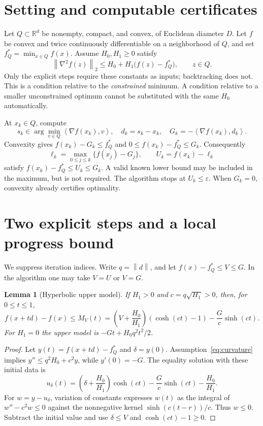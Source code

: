 \documentclass[11pt]{article}
\newtheorem{lemma}[theorem]{Lemma}
\newcommand{\norm}[1]{\left\|#1\right\|}
\newcommand{\inner}[2]{\left\langle#1,#2\right\rangle}
\newcommand{\R}{\mathbb R}
\begin{document}
\section{Setting and computable certificates}
Let $Q\subset\R^d$ be nonempty, compact, and convex, of Euclidean diameter
$D$. Let $f$ be convex and twice continuously differentiable on a neighborhood
of $Q$, and set $f_Q^*=\min_{x\in Q}f(x)$. Assume $H_0,H_1\ge0$ satisfy
\begin{equation}\label{eq:curvature}
 \norm{\nabla^2 f(z)}_2\le H_0+H_1\bigl(f(z)-f_Q^*\bigr),\qquad z\in Q.
\end{equation}
Only the explicit steps require these constants as inputs; backtracking
does not. This is a condition relative to the \emph{constrained} minimum. A condition
relative to a smaller unconstrained optimum cannot be substituted with the
same $H_0$ automatically.

At $x_k\in Q$, compute
\begin{equation}\label{eq:gap}
 s_k\in\arg\min_{v\in Q}\inner{\nabla f(x_k)}{v},\quad
 d_k=s_k-x_k,\quad G_k=-\inner{\nabla f(x_k)}{d_k}.
\end{equation}
Convexity gives $f(x_k)-G_k\le f_Q^*$ and
$0\le f(x_k)-f_Q^*\le G_k$. Consequently
\begin{equation}\label{eq:certificate}
 \ell_k=\max_{0\le j\le k}\{f(x_j)-G_j\},\qquad
 U_k=f(x_k)-\ell_k
\end{equation}
satisfy $f(x_k)-f_Q^*\le U_k\le G_k$. A valid known lower bound may be
included in the maximum, but is not required. The algorithm stops at
$U_k\le\varepsilon$. When $G_k=0$, convexity already certifies optimality.

\section{Two explicit steps and a local progress bound}
We suppress iteration indices. Write $q=\norm d$, and let
$f(x)-f_Q^*\le V\le G$. In the algorithm one may take $V=U$ or $V=G$.

\begin{lemma}[Hyperbolic upper model]\label{lem:model}
If $H_1>0$ and $c=q\sqrt{H_1}>0$, then, for $0\le t\le1$,
\begin{equation}\label{eq:model}
 f(x+td)-f(x)\le M_V(t)
 =\left(V+\frac{H_0}{H_1}\right)(\cosh(ct)-1)
 -\frac Gc\sinh(ct).
\end{equation}
For $H_1=0$ the upper model is $-Gt+H_0q^2t^2/2$.
\end{lemma}
\begin{proof}
Let $y(t)=f(x+td)-f_Q^*$ and $\delta=y(0)$. Assumption~\eqref{eq:curvature}
implies $y''\le q^2H_0+c^2y$, while $y'(0)=-G$.
The equality solution with these initial data is
\[
 u_\delta(t)=\left(\delta+\frac{H_0}{H_1}\right)\cosh(ct)
              -\frac Gc\sinh(ct)-\frac{H_0}{H_1}.
\]
For $w=y-u_\delta$, variation of constants expresses $w(t)$ as the
integral of $w''-c^2w\le0$ against the nonnegative kernel
$\sinh(c(t-r))/c$. Thus $w\le0$. Subtract the initial value and use
$\delta\le V$ and $\cosh(ct)-1\ge0$.
\end{proof}
\end{document}
